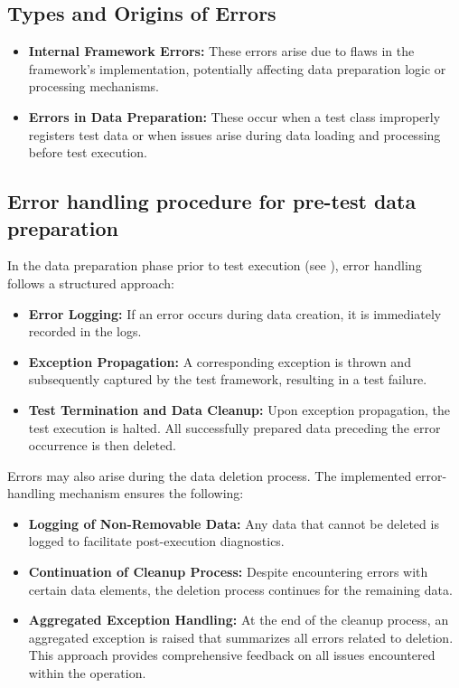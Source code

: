 \subsection{Types and Origins of Errors}
\begin{itemize}
\item \textbf{Internal Framework Errors:} These errors arise due to flaws in the framework's implementation, potentially affecting data preparation logic or processing mechanisms.
\item \textbf{Errors in Data Preparation:} These occur when a test class improperly registers test data or when issues arise during data loading and processing before test execution.
\end{itemize}


\subsection{Error handling procedure for pre-test data preparation} \label{subsec:HandleBefore}

In the data preparation phase prior to test execution (see ), error handling follows a structured approach:

\begin{itemize}
    \item \textbf{Error Logging:} If an error occurs during data creation, it is immediately recorded in the logs.
    \item \textbf{Exception Propagation:} A corresponding exception is thrown and subsequently captured by the test framework, resulting in a test failure.
    \item \textbf{Test Termination and Data Cleanup:} Upon exception propagation, the test execution is halted. All successfully prepared data preceding the error occurrence is then deleted.
\end{itemize}

Errors may also arise during the data deletion process. The implemented error-handling mechanism ensures the following:

\begin{itemize}
    \item \textbf{Logging of Non-Removable Data:} Any data that cannot be deleted is logged to facilitate post-execution diagnostics.
    \item \textbf{Continuation of Cleanup Process:} Despite encountering errors with certain data elements, the deletion process continues for the remaining data.
    \item \textbf{Aggregated Exception Handling:} At the end of the cleanup process, an aggregated exception is raised that summarizes all errors related to deletion. This approach provides comprehensive feedback on all issues encountered within the operation.
\end{itemize}

